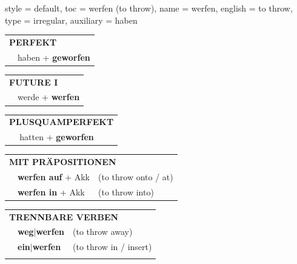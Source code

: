 \begin{verbentry}{
  style = {default},
  toc = {werfen (to throw)},
  name = {werfen},
  english = {to throw},
  type = {irregular},
  auxiliary = {haben}
}
    \vspace{10pt}

 \begin{tabular}{rl}
     \multicolumn{2}{l}{\textbf{PERFEKT}}\\
   & haben + \textbf{geworfen}\\
  \end{tabular}
\hfill
   \begin{tabular}{rl}
    \multicolumn{2}{l}{\textbf{FUTURE I} }\\
   & werde + \textbf{werfen}\\
  \end{tabular}
\hfill
   \begin{tabular}{rl}
      \multicolumn{2}{l}{\textbf{PLUSQUAMPERFEKT}}\\
   & hatten + \textbf{geworfen}\\
  \end{tabular}

   \vspace{10pt}

   \begin{tabular}{lll}
      \multicolumn{3}{l}{\textbf{MIT PRÄPOSITIONEN}}\\
& \textbf{werfen auf} + Akk & (to throw onto / at)\\
& \textbf{werfen in} + Akk & (to throw into)\\
\end{tabular}
  \hfill
   \begin{tabular}{lll}
      \multicolumn{3}{l}{\textbf{TRENNBARE VERBEN}}\\
 & \textbf{weg$|$werfen} & (to throw away)\\
 & \textbf{ein$|$werfen} & (to throw in / insert)\\
\vspace{10pt}
  \end{tabular}

  \vspace{-5pt}
\end{verbentry}

